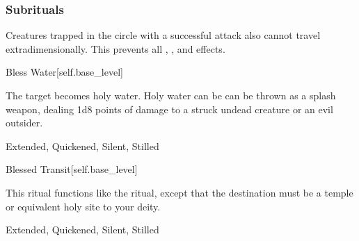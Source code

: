 \subsubsection{Subrituals}
Creatures trapped in the circle with a successful attack also cannot travel extradimensionally.
This prevents all , , and  effects.
\begin{spellsection}{Bless Water}[self.base_level]
\begin{spellcontent}
\begin{spelltargetinginfo}
\end{spelltargetinginfo}
\begin{spelleffects}
\spelleffect
The target becomes holy water.
Holy water can be can be thrown as a splash weapon, dealing 1d8 points of damage to a struck undead creature or an evil outsider.
\end{spelleffects}
\end{spellcontent}
\begin{spellfooter}
 Extended, Quickened, Silent, Stilled
\end{spellfooter}
\begin{spellsubcontent}
\end{spellsubcontent}
\end{spellsection}
\begin{spellsection}{Blessed Transit}[self.base_level]
\begin{spellcontent}
\begin{spelltargetinginfo}
\end{spelltargetinginfo}
\begin{spelleffects}
\spelleffect
This ritual functions like the  ritual, except that the destination must be a temple or equivalent holy site to your deity.
\end{spelleffects}
\end{spellcontent}
\begin{spellfooter}
 Extended, Quickened, Silent, Stilled
\end{spellfooter}
\begin{spellsubcontent}
\end{spellsubcontent}
\end{spellsection}
